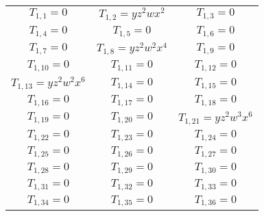 \documentclass[12pt]{memoireuqam1.3}
\begin{document}
\begin{longtable}{|c|c|c|} 
\hline
$T_{1,1}= 0$&

$T_{1,2}= yz^2wx^2$&

$T_{1,3}= 0$\\

$T_{1,4}= 0$&

$T_{1,5}= 0$&

$T_{1,6}= 0$\\

$T_{1,7}= 0$&

$T_{1,8}= yz^2w^2x^4$&

$T_{1,9}= 0$\\

$T_{1,10}= 0$&

$T_{1,11}= 0$&

$T_{1,12}= 0$\\

$T_{1,13}= yz^2w^2x^6$&

$T_{1,14}= 0$&

$T_{1,15}= 0$\\

$T_{1,16}= 0$&

$T_{1,17}= 0$&

$T_{1,18}= 0$\\

$T_{1,19}= 0$&

$T_{1,20}= 0$&

$T_{1,21}= yz^2w^3x^6$\\

$T_{1,22}= 0$&

$T_{1,23}= 0$&

$T_{1,24}= 0$\\

$T_{1,25}= 0$&

$T_{1,26}= 0$&

$T_{1,27}= 0$\\

$T_{1,28}= 0$&

$T_{1,29}= 0$&

$T_{1,30}= 0$\\

$T_{1,31}= 0$&

$T_{1,32}= 0$&

$T_{1,33}= 0$\\

$T_{1,34}= 0$&

$T_{1,35}= 0$&

$T_{1,36}= 0$\\


\end{longtable}
\end{document}
